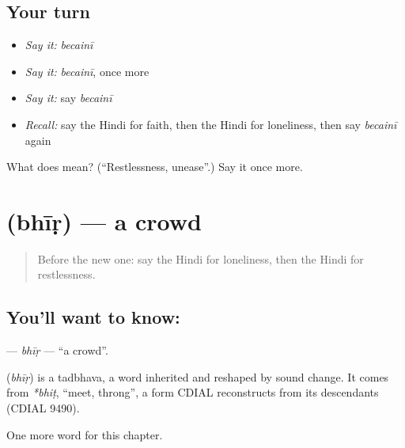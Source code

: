 \subsection*{Your turn}
\begin{itemize}
\raggedright
  \item \emph{Say it:} \emph{becainī}
  \item \emph{Say it:} \emph{becainī}, once more
  \item \emph{Say it:} say \emph{becainī}
  \item \emph{Recall:} say the Hindi for faith, then the Hindi for loneliness, then say \emph{becainī} again
\end{itemize}

\begin{tcolorbox}[breakable,colback=teal!4,colframe=teal!35!black,title={Before you move on}]
What does  mean? (\textquotedblleft{}Restlessness, unease\textquotedblright{}.) Say it once more.
\end{tcolorbox}
\section[\texorpdfstring{\hi{भीड़} (bhīṛ)}{भीड़ (bhīṛ)}]{ (bhīṛ) — a crowd}

\label{lesson:HI-C259-bhir}



\begin{quote}
Before the new one: say the Hindi for loneliness, then the Hindi for restlessness.
\end{quote}

\subsection*{You'll want to know: }
\textbf{} — \emph{bhīṛ} — \textquotedblleft{}a crowd\textquotedblright{}.

\begin{cousinweb}
\textbf{} (\emph{bhīṛ}) is a tadbhava, a word inherited and reshaped by sound change. It comes from \emph{*bhiṭ}, \textquotedblleft{}meet, throng\textquotedblright{}, a form CDIAL reconstructs from its descendants (CDIAL 9490).
\end{cousinweb}

\begin{grammarlens}[title={What you've built}]
One more word for this chapter.
\end{grammarlens}

